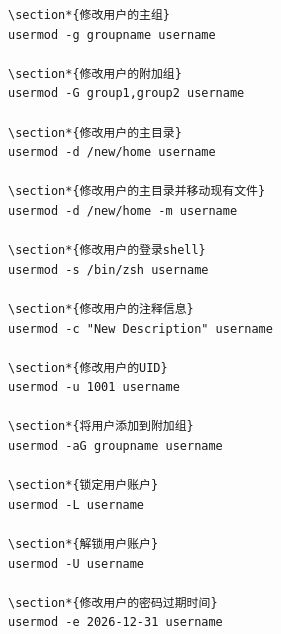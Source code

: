 \documentclass[12pt,UTF8]{ctexbook}
\begin{document}
\begin{verbatim}
\section*{修改用户的主组}
usermod -g groupname username

\section*{修改用户的附加组}
usermod -G group1,group2 username

\section*{修改用户的主目录}
usermod -d /new/home username

\section*{修改用户的主目录并移动现有文件}
usermod -d /new/home -m username

\section*{修改用户的登录shell}
usermod -s /bin/zsh username

\section*{修改用户的注释信息}
usermod -c "New Description" username

\section*{修改用户的UID}
usermod -u 1001 username

\section*{将用户添加到附加组}
usermod -aG groupname username

\section*{锁定用户账户}
usermod -L username

\section*{解锁用户账户}
usermod -U username

\section*{修改用户的密码过期时间}
usermod -e 2026-12-31 username
\end{verbatim}
\end{document}

